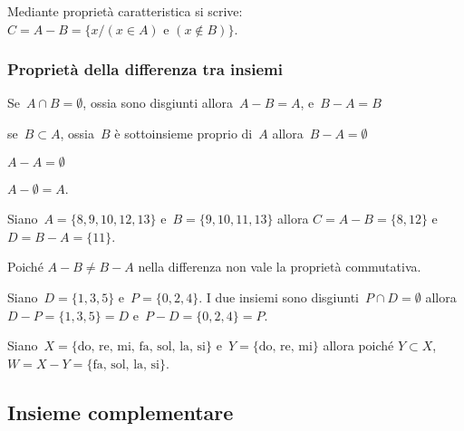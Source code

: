 \begin{center}

\end{center}
Mediante proprietà caratteristica si 
scrive:~$C=A-B=\{x/(x\in A)\text{ e }(x\notin B)\}$.

\subsubsection{Proprietà della differenza tra insiemi}

\begin{enumeratea}
\item Se~$A\cap B=\emptyset $, ossia sono disgiunti allora~$A-B=A$, e~$B-A=B$
\item se~$B\subset A$, ossia~$B$ è sottoinsieme proprio 
 di~$A$ allora~$B-A=\emptyset $
\item $A-A=\emptyset$
\item $A-\emptyset =A$.
\end{enumeratea}

\begin{exrig}
 \begin{esempio}
Siano~$A=\{8, 9, 10, 12, 13\}$ e~$B=\{9, 10, 11, 13\}$ allora
$C=A-B=\{8, 12\}$ e~$D=B-A=\{11\}$.
\begin{center}
 
\end{center}
 \end{esempio}
\end{exrig}

Poiché $A-B\neq B-A$ nella differenza non vale la proprietà
commutativa.

\begin{exrig}
 \begin{esempio}
Siano~$D=\{1, 3, 5\}$ e~$P=\{0, 2, 4\}$. I due insiemi sono 
disgiunti~$P\cap D=\emptyset$ allora~$D-P=\{1,3,5\}=D$ e~$P-D=\{0,2,4\}=P$.
 \end{esempio}

 \begin{esempio}
Siano~$X=\{\text{do, re, mi, fa, sol, la, si}\}$
e~$Y=\{\text{do, re, mi}\}$ allora poiché
$Y\subset X$, $W=X-Y=\{\text{fa, sol, la, si}\}$.
\begin{center}
 
\end{center}
 \end{esempio}
\end{exrig}


\subsection{Insieme complementare}
\label{subsec:op_complementare}

